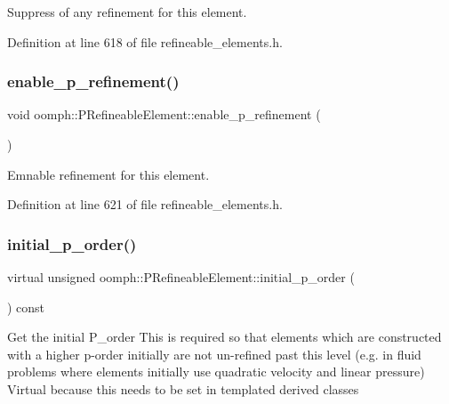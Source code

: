 Suppress of any refinement for this element. 



Definition at line 618 of file refineable\+\_\+elements.\+h.

\mbox{\label{classoomph_1_1PRefineableElement_a0c3aaa6e93d92bc06700016c1a195f32}} 
\subsubsection{\texorpdfstring{enable\+\_\+p\+\_\+refinement()}{enable\_p\_refinement()}}
{\footnotesize\ttfamily void oomph\+::\+P\+Refineable\+Element\+::enable\+\_\+p\+\_\+refinement (\begin{DoxyParamCaption}{ }\end{DoxyParamCaption})\hspace{0.3cm}{\ttfamily [inline]}}



Emnable refinement for this element. 



Definition at line 621 of file refineable\+\_\+elements.\+h.

\mbox{\label{classoomph_1_1PRefineableElement_a6babd48e981414ad54cbfc1d89977f43}} 
\subsubsection{\texorpdfstring{initial\+\_\+p\+\_\+order()}{initial\_p\_order()}}
{\footnotesize\ttfamily virtual unsigned oomph\+::\+P\+Refineable\+Element\+::initial\+\_\+p\+\_\+order (\begin{DoxyParamCaption}{ }\end{DoxyParamCaption}) const\hspace{0.3cm}{\ttfamily [pure virtual]}}

Get the initial P\+\_\+order This is required so that elements which are constructed with a higher p-\/order initially are not un-\/refined past this level (e.\+g. in fluid problems where elements initially use quadratic velocity and linear pressure) Virtual because this needs to be set in templated derived classes 

